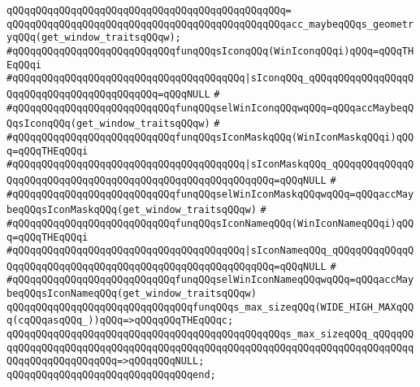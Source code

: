 \verb|qQQqqQQqqQQqqQQqqQQqqQQqqQQqqQQqqQQqqQQqqQQqqQQq=|\newline
\verb|qQQqqQQqqQQqqQQqqQQqqQQqqQQqqQQqqQQqqQQqqQQqqQQqacc_maybeqQQqs_geometryqQQq(get_window_traitsqQQqw);|\newline
\newline
\newline
\verb|#qQQqqQQqqQQqqQQqqQQqqQQqqQQqfunqQQqsIconqQQq(WinIconqQQqi)qQQq=qQQqTHEqQQqi|\newline
\verb|#qQQqqQQqqQQqqQQqqQQqqQQqqQQqqQQqqQQqqQQq|\verb#|sIconqQQq_qQQqqQQqqQQqqQQqqQQqqQQqqQQqqQQqqQQqqQQqqQQq=qQQqNULL#\newline
\verb|#|\newline
\verb|#qQQqqQQqqQQqqQQqqQQqqQQqqQQqfunqQQqselWinIconqQQqwqQQq=qQQqaccMaybeqQQqsIconqQQq(get_window_traitsqQQqw)|\newline
\verb|#|\newline
\verb|#qQQqqQQqqQQqqQQqqQQqqQQqqQQqfunqQQqsIconMaskqQQq(WinIconMaskqQQqi)qQQq=qQQqTHEqQQqi|\newline
\verb|#qQQqqQQqqQQqqQQqqQQqqQQqqQQqqQQqqQQqqQQq|\verb#|sIconMaskqQQq_qQQqqQQqqQQqqQQqqQQqqQQqqQQqqQQqqQQqqQQqqQQqqQQqqQQqqQQqqQQq=qQQqNULL#\newline
\verb|#|\newline
\verb|#qQQqqQQqqQQqqQQqqQQqqQQqqQQqfunqQQqselWinIconMaskqQQqwqQQq=qQQqaccMaybeqQQqsIconMaskqQQq(get_window_traitsqQQqw)|\newline
\verb|#|\newline
\verb|#qQQqqQQqqQQqqQQqqQQqqQQqqQQqfunqQQqsIconNameqQQq(WinIconNameqQQqi)qQQq=qQQqTHEqQQqi|\newline
\verb|#qQQqqQQqqQQqqQQqqQQqqQQqqQQqqQQqqQQqqQQq|\verb#|sIconNameqQQq_qQQqqQQqqQQqqQQqqQQqqQQqqQQqqQQqqQQqqQQqqQQqqQQqqQQqqQQqqQQq=qQQqNULL#\newline
\verb|#|\newline
\verb|#qQQqqQQqqQQqqQQqqQQqqQQqqQQqfunqQQqselWinIconNameqQQqwqQQq=qQQqaccMaybeqQQqsIconNameqQQq(get_window_traitsqQQqw)|\newline
\newline
\verb|qQQqqQQqqQQqqQQqqQQqqQQqqQQqqQQqfunqQQqs_max_sizeqQQq(WIDE_HIGH_MAXqQQq(cqQQqasqQQq_))qQQq=>qQQqqQQqTHEqQQqc;|\newline
\verb|qQQqqQQqqQQqqQQqqQQqqQQqqQQqqQQqqQQqqQQqqQQqqQQqs_max_sizeqQQq_qQQqqQQqqQQqqQQqqQQqqQQqqQQqqQQqqQQqqQQqqQQqqQQqqQQqqQQqqQQqqQQqqQQqqQQqqQQqqQQqqQQqqQQqqQQqqQQq=>qQQqqQQqNULL;|\newline
\verb|qQQqqQQqqQQqqQQqqQQqqQQqqQQqqQQqend;|\newline
